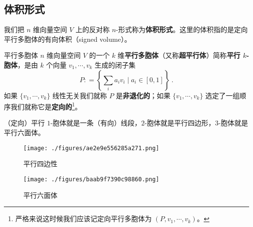 
\begin{issues}
\issueDraft
\end{issues}


\subsection{体积形式}




我们把 $n$ 维向量空间 $V$ 上的反对称 $n$-形式称为\textbf{体积形式}。这里的体积指的是定向平行多胞体的有向体积（signed volume）。

\begin{definition}{平行多胞体}
$n$ 维向量空间 $V$ 的一个 $k$ 维\textbf{平行多胞体}（又称\textbf{超平行体}）简称\textbf{平行 $k$-胞体}，是由 $k$ 个向量 $v_1, \cdots, v_k$ 生成的闭子集
\begin{equation}
P: = \left\{ \sum_i a_i v_i \mid a_i \in [0, 1] \right\}~.
\end{equation}
如果 $\{v_1, \cdots, v_k\}$ 线性无关我们就称 $P$ 是\textbf{非退化的}；如果 $\{v_1, \cdots, v_k\}$ 选定了一组顺序我们就称它是\textbf{定向的}\footnote{严格来说这时候我们应该记定向平行多胞体为 $(P, v_1, \cdots, v_k)$。}。
\end{definition}

\begin{example}{}
（定向）平行 $1$-胞体就是一条（有向）线段，$2$-胞体就是平行四边形，$3$-胞体就是平行六面体。
\end{example}

\begin{figure}[ht]
\centering
\texttt{[image: ./figures/ae2e9e556285a271.png]}
\caption{平行四边性} \label{fig_APdet_1}
\end{figure}
\begin{figure}[ht]
\centering
\texttt{[image: ./figures/baab9f7390c98860.png]}
\caption{平行六面体} \label{fig_APdet_2}
\end{figure}


